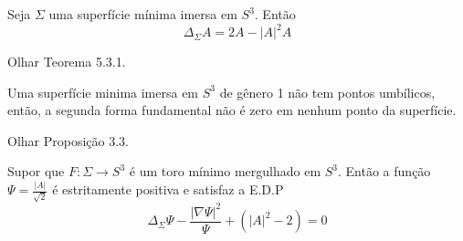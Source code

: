 \begin{teorema}\label{Simon's_identity}
	Seja $\Sigma$ uma superfície mínima imersa em $S^3$. Então
	\begin{equation*}
		\Delta_{\Sigma} A = 2 A - |A|^2 A
	\end{equation*} 
\end{teorema}

\begin{demonstracao}
	Olhar \cite{Simons1968} Teorema 5.3.1.
\end{demonstracao}

\begin{teorema}\label{nao_existem_pontos_umbilicos}
	Uma superfície minima imersa em $S^3$ de gênero 1 não tem pontos umbílicos, então, a segunda forma fundamental não é zero em nenhum ponto da superfície.
\end{teorema}

\begin{demonstracao}
	Olhar \cite{Brendle2013} Proposição 3.3.
\end{demonstracao}

\begin{proposicao}
	Supor que $F: \Sigma \rightarrow S^3$ é um toro mínimo mergulhado em $S^3$. Então a função $\Psi = \frac{|A|}{\sqrt{2}}$ é estritamente positiva e satisfaz a E.D.P
	\begin{equation*}
		\Delta_\Sigma \Psi - \frac{|\nabla \Psi|^2}{\Psi} + (|A|^2 - 2) = 0
	\end{equation*}
\end{proposicao}

